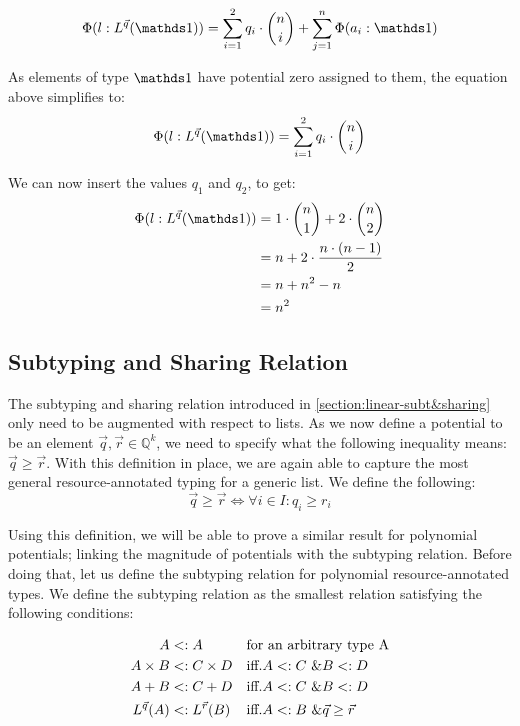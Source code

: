 \[
   \Phi(l: L^{\vec{q}}(\unit)) = \displaystyle\sum_{i = 1}^{2} q_i \cdot \binom{n}{i} + \displaystyle\sum_{j = 1}^{n} \Phi(a_i : \unit)
\]

As elements of type $\unit$ have potential zero assigned to them, the equation above simplifies to: 
\[
   \Phi(l: L^{\vec{q}}(\unit)) = \displaystyle\sum_{i = 1}^{2} q_i \cdot \binom{n}{i}
\]

We can now insert the values $q_1$ and $q_2$, to get:
\begin{align*}
   \Phi(l: L^{\vec{q}}(\unit)) & = 1 \cdot \binom{n}{1} + 2 \cdot \binom{n}{2} \\
			      & = n + 2 \cdot \frac{n \cdot (n - 1)}{2} \\
			      & = n + n^2 - n \\
			      & = n^2 
\end{align*}

\subsection{Subtyping and Sharing Relation}

The subtyping and sharing relation introduced in \ref{section:linear-subt&sharing} only need to be augmented with respect to lists. As we now define a potential to be an element \(\vec{q}, \vec{r} \in \mathbb{Q}^k\), we need to specify what the following inequality means: \(\vec{q} \geq \vec{r}\). With this definition in place, we are again able to capture the most general resource-annotated typing for a generic list. We define the following: 
\[
   \vec{q} \geq \vec{r} \iff \forall i \in I : q_i \geq r_i
\]

Using this definition, we will be able to prove a similar result for polynomial potentials; linking the magnitude of potentials with the subtyping relation. Before doing that, let us define the subtyping relation for polynomial resource-annotated types.
We define the subtyping relation as the smallest relation satisfying the following conditions:

\begin{align*}
   A & <: A && \text{for an arbitrary type A} \\
   A \times B & <: C \times D && \text{iff.} A <: C ~ \& B <: D \\
   A + B & <: C + D && \text{iff.} A <: C ~ \& B <: D \\
   L^{\vec{q}}(A) & <: L^{\vec{r}}(B) && \text{iff.} A <: B ~ \& \vec{q} \geq \vec{r} \\
\end{align*}


